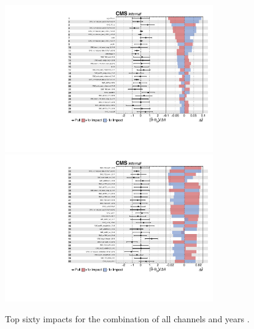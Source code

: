 \begin{figure}[ht]
    \begin{center}
        \includegraphics[width=0.8\textwidth]{figures/ch-8-systematic-uncertainties/impacts-all-1.pdf}\\
        \includegraphics[width=0.8\textwidth]{figures/ch-8-systematic-uncertainties/impacts-all-2.pdf}
    \end{center}
    \caption[Top sixty impacts for the combination of all channels and years.]{Top sixty impacts for the combination of all channels and years \cite{CMS-AN-20-213}.}
    \label{fig:impacts_pages_1_2}
\end{figure}
